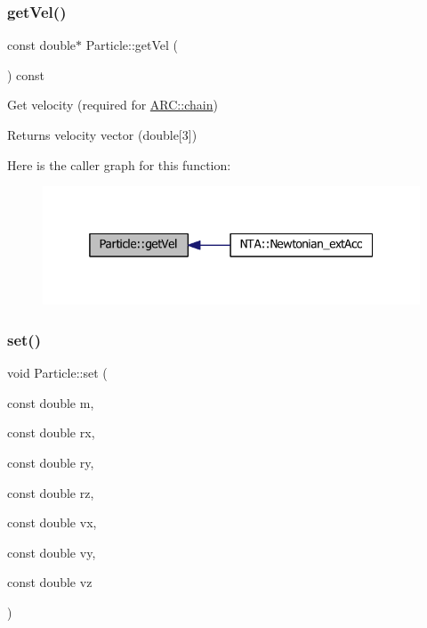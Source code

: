 \subsubsection{\texorpdfstring{get\+Vel()}{getVel()}}
{\footnotesize\ttfamily const double$\ast$ Particle\+::get\+Vel (\begin{DoxyParamCaption}{ }\end{DoxyParamCaption}) const\hspace{0.3cm}{\ttfamily [inline]}}



Get velocity (required for \hyperlink{classARC_1_1chain}{A\+R\+C\+::chain}) 

\begin{DoxyReturn}{Returns}
velocity vector (double\mbox{[}3\mbox{]}) 
\end{DoxyReturn}
Here is the caller graph for this function\+:
\nopagebreak
\begin{figure}[H]
\begin{center}
\leavevmode
\includegraphics[width=319pt]{classParticle_ab3d63df7f8c22f232b096ae33b6ea3ac_icgraph}
\end{center}
\end{figure}
\hypertarget{classParticle_a662b86df904c9a664e0e45d93b1f4715}{}\label{classParticle_a662b86df904c9a664e0e45d93b1f4715} 
\subsubsection{\texorpdfstring{set()}{set()}\hspace{0.1cm}{\footnotesize\ttfamily [1/3]}}
{\footnotesize\ttfamily void Particle\+::set (\begin{DoxyParamCaption}\item[{const double}]{m,  }\item[{const double}]{rx,  }\item[{const double}]{ry,  }\item[{const double}]{rz,  }\item[{const double}]{vx,  }\item[{const double}]{vy,  }\item[{const double}]{vz }\end{DoxyParamCaption})\hspace{0.3cm}{\ttfamily [inline]}}



